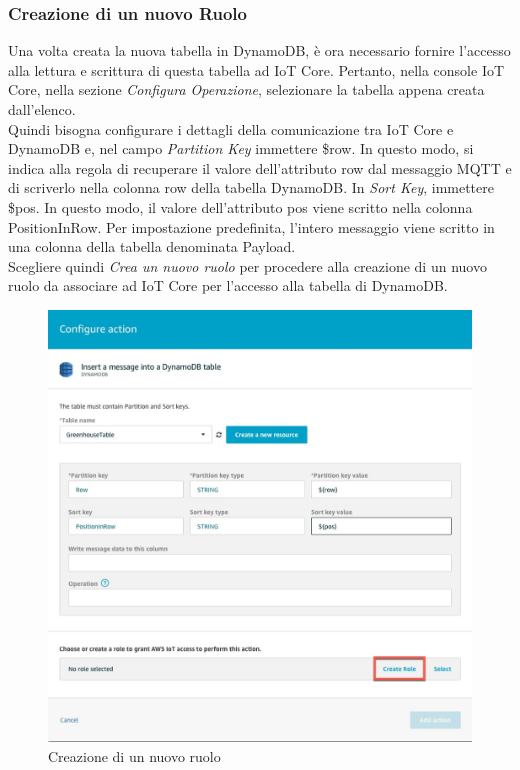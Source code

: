 \subsubsection{Creazione di un nuovo Ruolo}
Una volta creata la nuova tabella in DynamoDB, è ora necessario fornire l'accesso alla lettura e scrittura di questa tabella ad IoT Core. Pertanto, nella console IoT Core, nella sezione \textit{Configura Operazione}, selezionare la tabella appena creata dall'elenco.\\
Quindi bisogna configurare i dettagli della comunicazione tra IoT Core e DynamoDB e, nel campo \textit{Partition Key} immettere \${row}. In questo modo, si indica alla regola di recuperare il valore dell'attributo row dal messaggio MQTT e di scriverlo nella colonna row della tabella DynamoDB. In \textit{Sort Key}, immettere \${pos}. In questo modo, il valore dell'attributo pos viene scritto nella colonna PositionInRow. Per impostazione predefinita, l'intero messaggio viene scritto in una
colonna della tabella denominata Payload. \\
Scegliere quindi \textit{Crea un nuovo ruolo} per procedere alla creazione di un nuovo ruolo da associare ad IoT Core per l'accesso alla tabella di DynamoDB. 
\begin{figure}
	\begin{center}
		\includegraphics[width=0.41\columnwidth]{images/dynamodb_5}
	\end{center}
	\caption{Creazione di un nuovo ruolo}
	\label{fig:dynamodb_5}
\end{figure}

